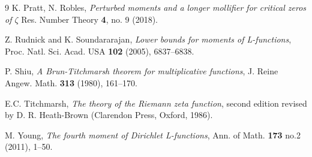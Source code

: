 \documentclass[oneside, 12pt]{amsart}
\theoremstyle{definition}
\begin{document}
\begin{thebibliography}{9}
K. Pratt, N. Robles, \emph{Perturbed moments and a longer mollifier for critical zeros of $\zeta$} Res. Number Theory {\bf 4}, no. 9 (2018).


 Z. Rudnick and K. Soundararajan, \emph{Lower bounds for moments of L-functions}, Proc. Natl. Sci. Acad. USA {\bf 102} (2005), 6837--6838.


P. Shiu, \emph{A Brun-Titchmarsh theorem for multiplicative functions}, J. Reine Angew. Math. {\bf 313} (1980), 161--170.





 E.C. Titchmarsh, \emph{The theory of the Riemann zeta function}, second edition revised by D. R. Heath-Brown (Clarendon Press, Oxford, 1986).


  M. Young, \emph{The fourth moment of Dirichlet L-functions}, Ann. of Math.  {\bf 173} no.2 (2011), 1--50.


\end{thebibliography}
\end{document}
